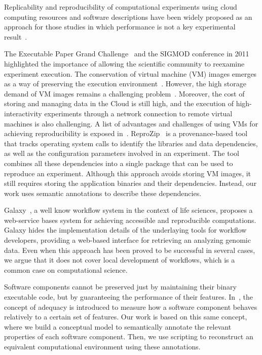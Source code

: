 Replicability and reproducibility of computational experiments using cloud computing resources and software descriptions have been widely proposed as an approach for those studies in which performance is not a key experimental result~\cite{Crick14}.

The Executable Paper Grand Challenge~\cite{elsevierchallenge} and the SIGMOD conference in 2011~\cite{SIGMOD} highlighted the importance of allowing the scientific community to reexamine experiment execution. The conservation of virtual machine (VM) images emerges as a way of preserving the execution environment~\cite{Brammer,SHARE}. However, the high storage demand of VM images remains a challenging problem~\cite{Mao:2014:ROD:2600090.2512348,6552826}. Moreover, the cost of storing and managing data in the Cloud is still high, and the execution of high-interactivity experiments through a network connection to remote virtual machines is also challenging. A list of advantages and challenges of using VMs for achieving reproducibility is exposed in~\cite{Howe2012}. ReproZip~\cite{reprozip} is a provenance-based tool that tracks operating system calls to identify the libraries and data dependencies, as well as the configuration parameters involved in an experiment. The tool combines all these dependencies into a single package that can be used to reproduce an experiment. Although this approach avoids storing VM images, it still requires storing the application binaries and their dependencies. Instead, our work uses semantic annotations to describe these dependencies.


Galaxy~\cite{goecks2010galaxy}, a well know workflow system in the context of life sciences, proposes a web-service bases system for achieving accessible and reproducible computations. Galaxy hides the implementation details of the underlaying tools for workflow developers, providing a web-based interface for retrieving an analyzing genomic data. Even when this approach has been proved to be successful in several cases, we argue that it does not cover local development of workflows, which is a common case on computational science.  


Software components cannot be preserved just by maintaining their binary executable code, but by guaranteeing the performance of their features. In~\cite{Matthews}, the concept of adequacy is introduced to measure how a software component behaves relatively to a certain set of features. Our work is based on this same concept, where we build a conceptual model to semantically annotate the relevant properties of each software component. Then, we use scripting to reconstruct an equivalent computational environment using these annotations.

